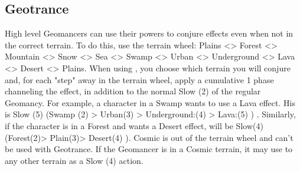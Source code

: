 \subsection{Geotrance}
\label{subsec:geo-trance}

\begin{multicols}{2}

High level Geomancers can use their powers to conjure effects even when not in the correct terrain. To do this, use the terrain wheel: Plains <> Forest <> Mountain <> Snow <> Sea <> Swamp <> Urban <> Underground <> Lava <> Desert <> Plains. When using , you choose which terrain you will conjure and, for each "step" away in the terrain wheel, apply a cumulative 1 phase channeling the effect, in addition to the normal Slow (2) of the regular Geomancy. For example, a character in a Swamp wants to use a Lava effect. His  is Slow (5) (Swamp (2) > Urban(3) > Underground:(4) > Lava:(5) ) . Similarly, if the character is in a Forest and wants a Desert effect,  will be Slow(4) (Forest(2)> Plain(3)> Desert(4) ). Cosmic is out of the terrain wheel and can’t be used with Geotrance. If the Geomancer is in a Cosmic terrain, it may use  to any other terrain as a Slow (4) action.

\begin{center}
\end{center}
\end{multicols}